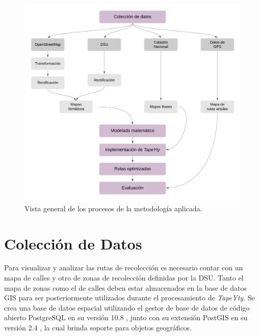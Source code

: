 \begin{figure}[H]
\centerline{\includegraphics[width=\textwidth]{DiagramaDeMetodologia.png}}
\caption{Vista general de los procesos de la metodología aplicada.}
\label{fig:metodologia}
\end{figure}


\section{Colección de Datos}

Para visualizar y analizar las rutas de recolección es necesario contar con un mapa de calles y otro de zonas de recolección definidas por la DSU. Tanto el mapa de zonas como el de calles deben estar almacenados en la base de datos GIS para ser posteriormente utilizados durante el procesamiento de \textit{TapeYty}. Se crea una base de datos espacial utilizando el gestor de base de datos de código abierto PostgreSQL en su versión 10.8 \citep{PostgreSQL}, junto con su extensión PostGIS en su versión 2.4 \citep{PostGIS}, la cual brinda soporte para objetos geográficos.

